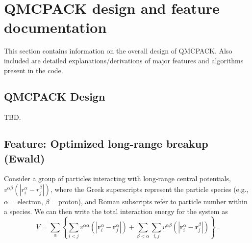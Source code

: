 \chapter{QMCPACK design and feature documentation}
\label{chap:design_features}

This section contains information on the overall design of QMCPACK.  Also included are detailed explanations/derivations of major features and algorithms present in the code.


\section{QMCPACK Design}
TBD.



\newpage
\section{Feature: Optimized long-range breakup (Ewald)}


Consider a group of particles interacting with long-range central
potentials, $v^{\alpha \beta}(|r^{\alpha}_i - r^{\beta}_j|)$, where the Greek superscripts
represent the particle species (e.g., $\alpha=\text{electron}$,
$\beta=\text{proton}$), and Roman subscripts refer to particle number
within a species.  We can then write the total interaction energy for
the system as
\newcommand{\vr}{\mathbf{r}}
\newcommand{\vR}{\mathbf{R}}
\newcommand{\vk}{\mathbf{k}}
\newcommand{\vq}{\mathbf{q}}
\begin{equation}
V = \sum_\alpha \left\{\sum_{i<j} v^{\alpha\alpha}(|\vr^\alpha_i - \vr^\alpha_j|) +
\sum_{\beta<\alpha} 
\sum_{i,j} v^{\alpha \beta}(|\vr^{\alpha}_i - \vr^{\beta}_j|) \right\}
\label{eq:Vperiodic}\:.
\end{equation}
\newcommand{\va}{\mathbf{a}}
\newcommand{\vb}{\mathbf{b}}
\newcommand{\vL}{\mathbf{L}}

